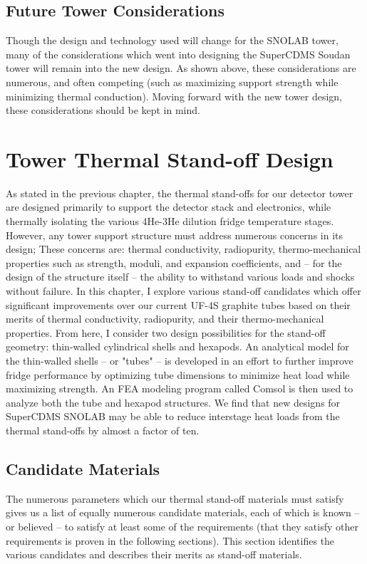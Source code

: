 \documentclass{report}
\begin{document}
\section{Future Tower Considerations}
Though the design and technology used will change for the SNOLAB tower, many of the considerations which went into designing the SuperCDMS Soudan tower will remain into the new design. As shown above, these considerations are numerous, and often competing (such as maximizing support strength while minimizing thermal conduction). Moving forward with the new tower design, these considerations should be kept in mind.


\chapter{Tower Thermal Stand-off Design}

As stated in the previous chapter, the thermal stand-offs for our detector tower are designed primarily to support the detector stack and electronics, while thermally isolating the various 4He-3He dilution fridge temperature stages. However, any tower support structure must address numerous concerns in its design; These concerns are: thermal conductivity, radiopurity, thermo-mechanical properties such as strength, moduli, and expansion coefficients, and -- for the design of the structure itself -- the ability to withstand various loads and shocks without failure. In this chapter, I explore various stand-off candidates which offer significant improvements over our current UF-4S graphite tubes based on their merits of thermal conductivity, radiopurity, and their thermo-mechanical properties. From here, I consider two design possibilities for the stand-off geometry: thin-walled cylindrical shells and hexapods. An analytical model for the thin-walled shells -- or "tubes" -- is developed in an effort to further improve fridge performance by optimizing tube dimensions to minimize heat load while maximizing strength. An FEA modeling program called Comsol is then used to analyze both the tube and hexapod structures. We find that new designs for SuperCDMS SNOLAB may be able to reduce interstage heat loads from the thermal stand-offs by almost a factor of ten.

\section{Candidate Materials}
The numerous parameters which our thermal stand-off materials must satisfy gives us a list of equally numerous candidate materials, each of which is known -- or believed -- to satisfy at least some of the requirements (that they satisfy other requirements is proven in the following sections). This section identifies the various candidates and describes their merits as stand-off materials.
\end{document}
